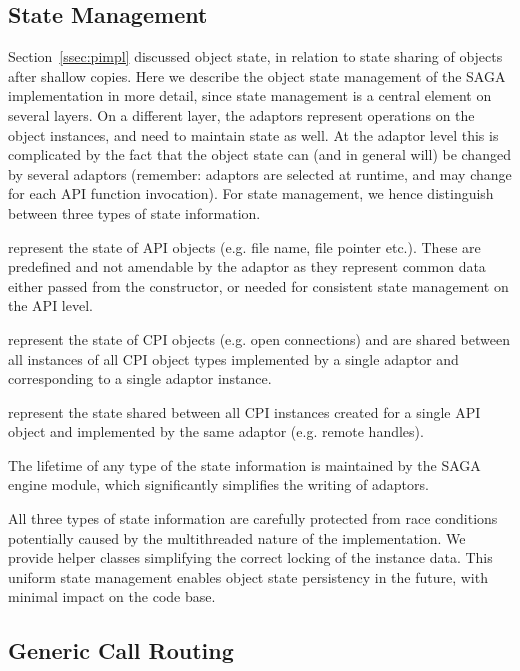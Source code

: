 \subsection{State Management}

Section~\ref{ssec:pimpl} discussed object state, in relation to
state sharing of objects after shallow copies.  Here we describe the object
state management of the SAGA implementation in more detail, since state
management is a central element on several layers.
On a different layer, the adaptors represent
operations on the object instances, and need to maintain state as well.
At the adaptor level this is complicated by the fact that the object state can (and in
general will) be changed by several adaptors (remember: adaptors are selected
at runtime, and may change for each API function invocation).  For state 
management, we hence distinguish between three types of state information.

\begin{shortlist}
	\item {} represent the state of API objects (e.g. file name, 
			file pointer etc.). These are predefined and not amendable by the adaptor
			as they represent common data either passed from the constructor,
			or needed for consistent state management on the API level.
	\item {} represent the state of CPI objects (e.g. open connections)
      and are shared between all instances of all CPI object types
			implemented by 
			a single adaptor and corresponding to a single adaptor instance. 
	\item {} represent the state shared between all CPI 
			instances created for a single API object and implemented by the same 
			adaptor (e.g. remote handles). 
\end{shortlist}

The lifetime of any type of the state information is maintained by the SAGA engine 
module, which significantly simplifies the writing of adaptors.

All three types of state information are carefully protected from race 
conditions potentially caused by the multithreaded nature of the implementation.
We provide helper classes simplifying the 
correct locking of the instance data. 
This uniform state management enables 
object state persistency in the future, with minimal impact on the 
code base.

\subsection{Generic Call Routing}
\label{ssec:routing}

